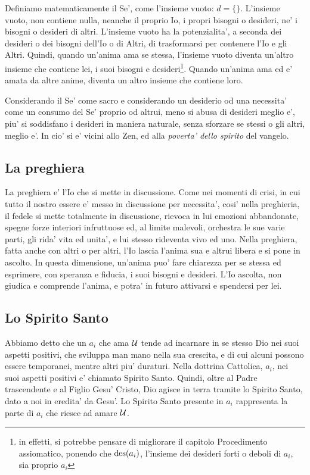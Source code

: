 Definiamo matematicamente il Se', come l'insieme vuoto: $d=\{\}$. L'insieme vuoto, non contiene nulla, neanche il proprio Io, i propri bisogni o desideri, ne' i bisogni o desideri di altri. L'insieme vuoto ha la potenzialita', a seconda dei desideri o dei bisogni dell'Io o di Altri, di trasformarsi per contenere l'Io e gli Altri. Quindi, quando un'anima ama se stessa, l'insieme vuoto diventa un'altro insieme che contiene lei, i suoi bisogni e desideri\footnote{in effetti, si potrebbe pensare di migliorare il capitolo Procedimento assiomatico, ponendo che $\textrm{des}(a_i)$, l'insieme dei desideri forti o deboli di $a_i$, sia proprio $a_i$}. Quando un'anima ama ed e' amata da altre anime, diventa un altro insieme che contiene loro.

Considerando il Se' come sacro e considerando un desiderio od una necessita' come un consumo del Se' proprio od altrui, meno si abusa di desideri meglio e', piu' si soddisfano i desideri in maniera naturale, senza sforzare se stessi o gli altri, meglio e'. In cio' si e' vicini allo Zen, ed alla \emph{poverta' dello spirito} del vangelo.


\subsection{La preghiera}

La preghiera e' l'Io che si mette in discussione. Come nei momenti di crisi, in cui tutto il nostro essere e' messo in discussione per necessita', cosi' nella preghieria, il fedele si mette totalmente in discussione, rievoca in lui emozioni abbandonate, spegne forze interiori infruttuose ed, al limite malevoli, orchestra le sue varie parti, gli rida' vita ed unita', e lui stesso rideventa vivo ed uno.
Nella preghiera, fatta anche con altri o per altri, l'Io lascia l'anima sua e altrui libera e si pone in ascolto. In questa dimensione, un'anima puo' fare chiarezza per se stessa ed esprimere, con speranza e fiducia, i suoi bisogni e desideri. 
L'Io ascolta, non giudica e comprende l'anima, e potra' in futuro attivarsi e spendersi per lei.

\subsection{Lo Spirito Santo}
\label{definizioneAnimo}

Abbiamo detto che un $a_i$ che ama $\mathcal{U}$ tende ad incarnare in se stesso Dio nei suoi aspetti positivi, che sviluppa man mano nella sua crescita, e di cui alcuni possono essere temporanei, mentre altri piu' duraturi. Nella dottrina Cattolica, $a_i$, nei suoi aspetti positivi e' chiamato Spirito Santo. Quindi, oltre al Padre trascendente e al Figlio Gesu' Cristo, Dio agisce in terra tramite lo Spirito Santo, dato a noi in eredita' da Gesu'. Lo Spirito Santo presente in $a_i$ rappresenta la parte di $a_i$ che riesce ad amare $\mathcal{U}$.

